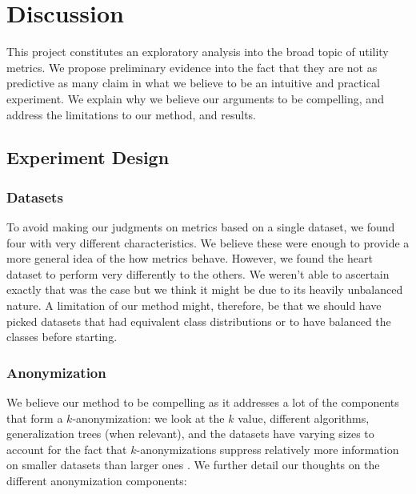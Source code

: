 \chapter{Discussion}
This project constitutes an exploratory analysis into the broad topic of utility metrics. We propose preliminary evidence into the fact that they are not as predictive as many claim \cite{hellinger&biv, ambiguity_metric, cm_granularity_metric, distance_metrics, ilm,ambiguity_metric,dse_metric,entropy_measure} in what we believe to be an intuitive and practical experiment. We explain why we believe our arguments to be compelling, and address the limitations to our method, and results.


\section{Experiment Design}
\subsection{Datasets}
To avoid making our judgments on metrics based on a single dataset, we found four with very different characteristics. We believe these were enough to provide a more general idea of the how metrics behave. However, we found the heart dataset to perform very differently to the others. We weren't able to ascertain exactly that was the case but we think it might be due to its heavily unbalanced nature. A limitation of our method might, therefore, be that we should have picked datasets that had equivalent class distributions or to have balanced the classes before starting. 


\subsection{Anonymization}
We believe our method to be compelling as it addresses a lot of the components that form a $k$-anonymization: we look at the $k$ value, different algorithms, generalization trees (when relevant), and the datasets have varying sizes to account for the fact that $k$-anonymizations suppress relatively more information on smaller datasets than larger ones \cite{small_set_problem}. We further detail our thoughts on the different anonymization components:

